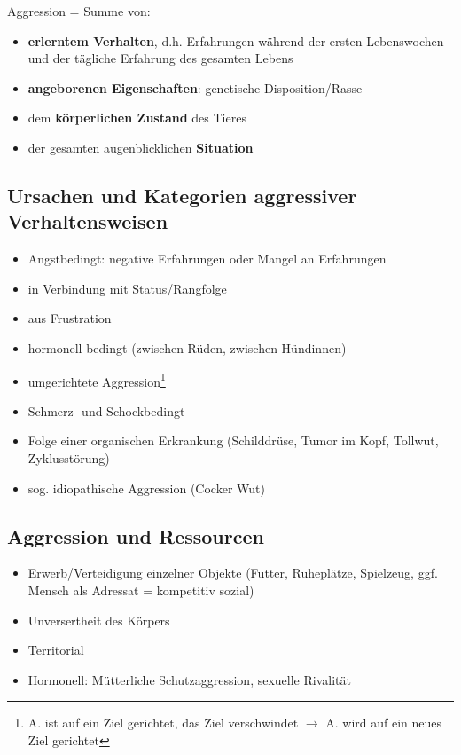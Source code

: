     \clearpage
    Aggression = Summe von:
    \begin{itemize}
        \item \textbf{erlerntem Verhalten}, d.h. Erfahrungen während der ersten Lebenswochen und der tägliche Erfahrung des gesamten Lebens
        \item \textbf{angeborenen Eigenschaften}: genetische Disposition/Rasse
        \item dem \textbf{körperlichen Zustand} des Tieres
        \item der gesamten augenblicklichen \textbf{Situation}
    \end{itemize}

    \subsection{Ursachen und Kategorien aggressiver Verhaltensweisen}
        \begin{itemize}
            \item Angstbedingt: negative Erfahrungen oder Mangel an Erfahrungen
            \item in Verbindung mit Status/Rangfolge
            \item aus Frustration
            \item hormonell bedingt (zwischen Rüden, zwischen Hündinnen)
            \item umgerichtete Aggression\footnote{A. ist auf ein Ziel gerichtet, das Ziel verschwindet $\rightarrow$ A. wird auf ein neues Ziel gerichtet}
            \item Schmerz- und Schockbedingt
            \item Folge einer organischen Erkrankung (Schilddrüse, Tumor im Kopf, Tollwut, Zyklusstörung)
            \item sog. \glqq idiopathische\grqq{}{} Aggression (\glqq Cocker Wut\grqq{}{})
        \end{itemize}

    \subsection{Aggression und Ressourcen}
    \begin{itemize}
        \item Erwerb/Verteidigung einzelner Objekte (Futter, Ruheplätze, Spielzeug, ggf. Mensch als Adressat = kompetitiv sozial)
        \item Unversertheit des Körpers
        \item Territorial
        \item Hormonell: Mütterliche Schutzaggression, sexuelle Rivalität
    \end{itemize}


